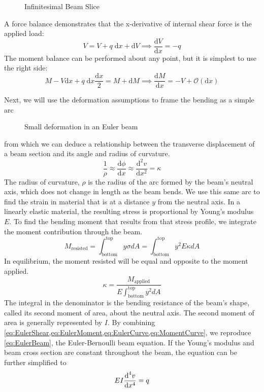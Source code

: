 %
\begin{figure}[htbp]
  \centering
  
  \caption{Infinitesimal Beam Slice}
  \label{fig:Infinitesimal}
\end{figure}
%
A force balance demonstrates that the x-derivative of internal shear force is the applied load:
\begin{equation}
\label{eq:EulerShear}
V = V + q\;\text{d}x + \text{d}V \implies \frac{\text{d}V}{\text{d}x} = -q
\end{equation}
The moment balance can be performed about any point, but it is simplest to use the right side:
\begin{equation}
\label{eq:EulerMoment}
M - V\text{d}x +q\;\text{d}x\frac{\text{d}x}{2} = M + \text{d}M \implies \frac{\text{d} M}{\text{d}x} = -V + \mathcal{O}(\text{d}x)
\end{equation}


Next, we will use the deformation assumptions to frame the bending as a simple arc
%
\begin{figure}[htbp]
  \centering
  
  \caption{Small deformation in an Euler beam}
  \label{fig:EulerBeam1}
\end{figure}
%
from which we can deduce a relationship between the transverse displacement of a beam section and its angle and radius of curvature.
\begin{equation}
 \label{eq:EulerCurve}
 \frac{1}{\rho} \approx \frac{\text{d} \phi}{\text{d} x} \approx \frac{\text{d}^2v}{\text{d}x^2} = \kappa
\end{equation}
The radius of curvature, $\rho$ is the radius of the arc formed by the beam's neutral axis, which does not change in length as the beam bends.
We use this same arc to find the strain in material that is at a distance $y$ from the neutral axis.
In a linearly elastic material, the resulting stress is proportional by Young's modulus $E$.
To find the bending moment that results from that stress profile, we integrate the moment contribution through the beam.
\begin{equation}
M_\text{resisted} = \int_\text{bottom}^\text{top}y\sigma dA = \int_\text{bottom}^\text{top}y^2 E \kappa dA
\end{equation}
In equilibrium, the moment resisted will be equal and opposite to the moment applied.
\begin{equation}
\label{eq:MomentCurve}
\kappa = \frac{M_\text{applied}}{E \int_\text{bottom}^\text{top}y^2dA}
\end{equation}
The integral in the denominator is the bending resistance of the beam's shape, called its second moment of area, about the neutral axis.
The second moment of area is generally represented by $I$.
By combining \cref{eq:EulerShear,eq:EulerMoment,eq:EulerCurve,eq:MomentCurve}, we reproduce  \cref{eq:EulerBeam}, the Euler-Bernoulli beam equation.
If the Young's modulus and beam cross section are constant throughout the beam, the equation can be further simplified to
\begin{equation}
EI\frac{\text{d}^4 v}{\text{d}x^4}=q\notag
\end{equation}

